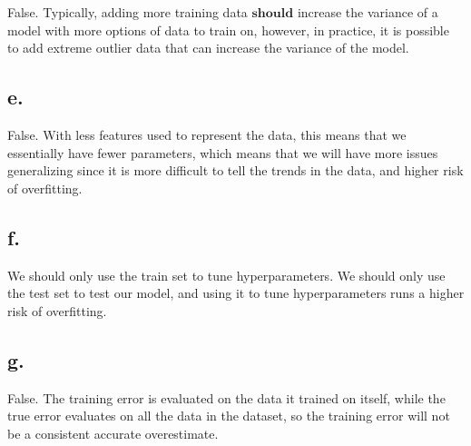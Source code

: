 \documentclass{article}
\newcommand{\1}{\mathbf{1}}
\begin{document}
{False. Typically, adding more training data $\textbf{should}$ increase the variance of a model with more options of data to train on, however, in practice, it is possible to add extreme outlier data that can increase the variance of the model.

\subsection*{e.}

False. With less features used to represent the data, this means that we essentially have fewer parameters, which means that we will have more issues generalizing since it is more difficult to tell the trends in the data, and higher risk of overfitting.

\subsection*{f.}

We should only use the train set to tune hyperparameters. We should only use the test set to test our model, and using it to tune hyperparameters runs a higher risk of overfitting.

\subsection*{g.}

False. The training error is evaluated on the data it trained on itself, while the true error evaluates on all the data in the dataset, so the training error will not be a consistent accurate overestimate.

\newpage

}
\end{document}
